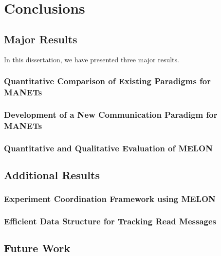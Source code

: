 \chapter{Conclusions}

\section{Major Results}

In this dissertation, we have presented three major results.

\subsection{Quantitative Comparison of Existing Paradigms for MANETs}



\subsection{Development of a New Communication Paradigm for MANETs}

\subsection{Quantitative and Qualitative Evaluation of MELON}

\section{Additional Results}

\subsection{Experiment Coordination Framework using MELON}

\subsection{Efficient Data Structure for Tracking Read Messages}

\section{Future Work}
